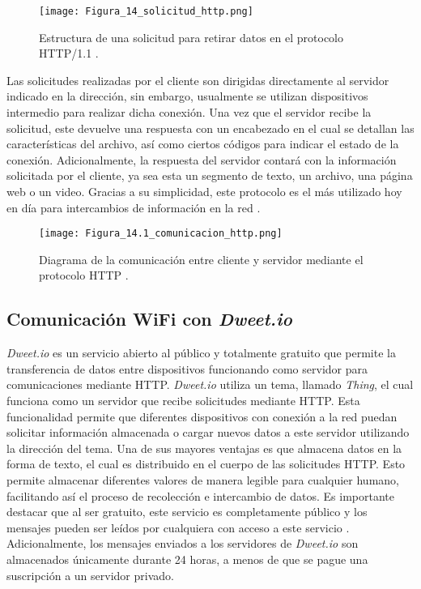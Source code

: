 \begin{figure}[H]
	\centering
	\texttt{[image: Figura\_14\_solicitud\_http.png]}
	\caption{Estructura de una solicitud para retirar datos en el protocolo HTTP/1.1 \cite{overview_http_mozilla_2024}.}
	\label{fig:mesh14}
\end{figure}

Las solicitudes realizadas por el cliente son dirigidas directamente al servidor indicado en la dirección, sin embargo, usualmente se utilizan dispositivos intermedio para realizar dicha conexión. Una vez que el servidor recibe la solicitud, este devuelve una respuesta con un encabezado en el cual se detallan las características del archivo, así como ciertos códigos para indicar el estado de la conexión. Adicionalmente, la respuesta del servidor contará con la información solicitada por el cliente, ya sea esta un segmento de texto, un archivo, una página web o un video. Gracias a su simplicidad, este protocolo es el más utilizado hoy en día para intercambios de información en la red \cite{overview_http_mozilla_2024}.

\begin{figure}[H]
	\centering
	\texttt{[image: Figura\_14.1\_comunicacion\_http.png]}
	\caption{Diagrama de la comunicación entre cliente y servidor mediante el protocolo HTTP \cite{overview_http_mozilla_2024}.}
	\label{fig:mesh14_1}
\end{figure}

\subsection{Comunicación WiFi con \textit{Dweet.io}}
\textit{Dweet.io} es un servicio abierto al público y totalmente gratuito que permite la transferencia de datos entre dispositivos funcionando como servidor para comunicaciones mediante HTTP. \textit{Dweet.io} utiliza un tema, llamado \textit{Thing}, el cual funciona como un servidor que recibe solicitudes mediante HTTP. Esta funcionalidad permite que diferentes dispositivos con conexión a la red puedan solicitar información almacenada o cargar nuevos datos a este servidor utilizando la dirección del tema. Una de sus mayores ventajas es que almacena datos en la forma de texto, el cual es distribuido en el cuerpo de las solicitudes HTTP. Esto permite almacenar diferentes valores de manera legible para cualquier humano, facilitando así el proceso de recolección e intercambio de datos. Es importante destacar que al ser gratuito, este servicio es completamente público y los mensajes pueden ser leídos por cualquiera con acceso a este servicio \cite{dweet_dweetio_faq}. Adicionalmente, los mensajes enviados a los servidores de \textit{Dweet.io} son almacenados únicamente durante 24 horas, a menos de que se pague una suscripción a un servidor privado.

